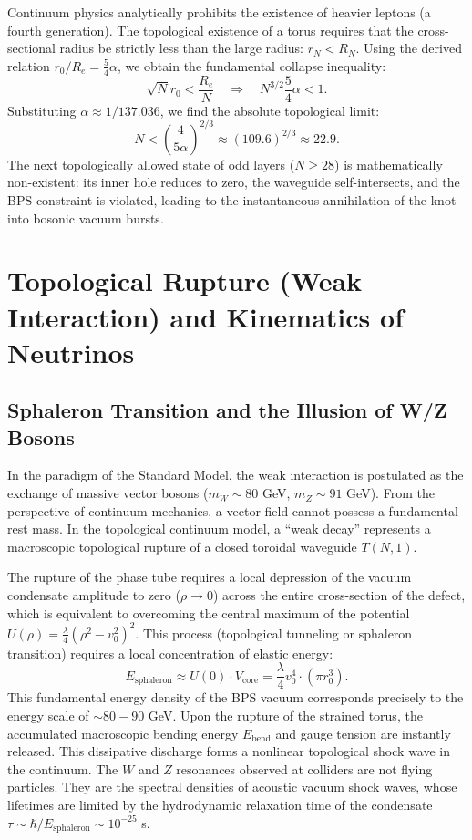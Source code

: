 \documentclass[12pt,a4paper]{article}
\begin{document}
Continuum physics analytically prohibits the existence of heavier leptons (a fourth generation). The topological existence of a torus requires that the cross-sectional radius be strictly less than the large radius: $r_N < R_N$. Using the derived relation $r_0/R_e = \frac{5}{4}\alpha$, we obtain the fundamental collapse inequality:
\begin{equation}
	\sqrt{N} r_0 < \frac{R_e}{N} \quad \Longrightarrow \quad N^{3/2} \frac{5}{4}\alpha < 1.
\end{equation}
Substituting $\alpha \approx 1/137.036$, we find the absolute topological limit:
\begin{equation}
	N < \left( \frac{4}{5\alpha} \right)^{2/3} \approx (109.6)^{2/3} \approx 22.9.
\end{equation}
The next topologically allowed state of odd layers ($N \ge 28$) is mathematically non-existent: its inner hole reduces to zero, the waveguide self-intersects, and the BPS constraint is violated, leading to the instantaneous annihilation of the knot into bosonic vacuum bursts.

\section{Topological Rupture (Weak Interaction) and Kinematics of Neutrinos}

\subsection{Sphaleron Transition and the Illusion of W/Z Bosons}
In the paradigm of the Standard Model, the weak interaction is postulated as the exchange of massive vector bosons ($m_W \sim 80$ GeV, $m_Z \sim 91$ GeV). From the perspective of continuum mechanics, a vector field cannot possess a fundamental rest mass. In the topological continuum model, a ``weak decay'' represents a macroscopic topological rupture of a closed toroidal waveguide $T(N,1)$.

The rupture of the phase tube requires a local depression of the vacuum condensate amplitude to zero ($\rho \to 0$) across the entire cross-section of the defect, which is equivalent to overcoming the central maximum of the potential $U(\rho) = \frac{\lambda}{4}(\rho^2 - v_0^2)^2$. This process (topological tunneling or sphaleron transition) requires a local concentration of elastic energy:
\begin{equation}
	E_{\text{sphaleron}} \approx U(0) \cdot V_{\text{core}} = \frac{\lambda}{4} v_0^4 \cdot (\pi r_0^3).
\end{equation}
This fundamental energy density of the BPS vacuum corresponds precisely to the energy scale of $\sim 80-90$ GeV. Upon the rupture of the strained torus, the accumulated macroscopic bending energy $E_{\text{bend}}$ and gauge tension are instantly released. This dissipative discharge forms a nonlinear topological shock wave in the continuum. 
The $W$ and $Z$ resonances observed at colliders are not flying particles. They are the spectral densities of acoustic vacuum shock waves, whose lifetimes are limited by the hydrodynamic relaxation time of the condensate $\tau \sim \hbar / E_{\text{sphaleron}} \sim 10^{-25}$ s. 
\end{document}
